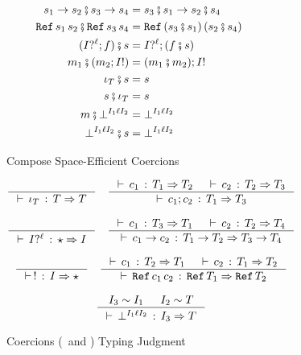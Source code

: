 \documentclass[acmtog, authorversion, acmlarge]{acmart}
\begin{document}
\begin{figure}[tbh]
\begin{subfigure}{.5\textwidth}
\begin{align*}
    \\
      \cmp{\fn{\SE_1}{\SE_2}}
          {\fn{\SE_3}{\SE_4}} &=
          \fn{\cmp{\SE_3}{\SE_1}}
             {\cmp{\SE_2}{\SE_4}}
    \\
    \cmp{\rf{\SE_1}{\SE_2}}{\rf{\SE_3}{\SE_4}} &=
    \rf{(\cmp{\SE_3}{\SE_1})}{(\cmp{\SE_2}{\SE_4})}
    \\
    \cmp{(\Seq{\prj[\I]{\Lbl}}{\Fnl})}{\SE} &=
    \Seq{\prj[\I]{\Lbl}}{(\cmp{\Fnl}{\SE})}
    \\
    \cmp{\Int_1}{(\Seq{\Int_2}{\inj[\I]})} &=
    \Seq{(\cmp{\Int_1}{\Int_2})}{\inj[\I]}
    \\
    \cmp{\id[\T]}{\SE} &= \SE
    \\
    \cmp{\SE}{\id[\T]} &= \SE
    \\
    \cmp{\Int}{\failed{\I_1}{\Lbl}{\I_2}} &=
    \failed{\I_1}{\Lbl}{\I_2}
    \\
    \cmp{\failed{\I_1}{\Lbl}{\I_2}}{\SE} &=
    \failed{\I_1}{\Lbl}{\I_2}
    \end{align*}
    \caption{Compose Space-Efficient Coercions}
    \label{fig:composeMed}
      \end{subfigure}%
    \begin{subfigure}{.5\textwidth}
    \begin{gather*}
      \inference{}{\cwt{\id[\T]}{\T}{\T}}
      \quad
      \inference{\cwt{\Crcn_1}{\T_1}{\T_2} & \cwt{\Crcn_2}{\T_2}{\T_3}}
                {\cwt{\Seq{\Crcn_1}{\Crcn_2}}{\T_1}{\T_3}}
      \\[2ex]
      \inference{}{\cwt{\prj[\I]{\Lbl}}{\Dyn}{\I}}
      \quad
      \inference{\cwt{\Crcn_1}{\T_{3}}{\T_{1}} & \cwt{\Crcn_2}{\T_{2}}{\T_{4}}}
                {\cwt{\fn{\Crcn_1}{\Crcn_2}}
                     {\Fn{\T_{1}}{\T_{2}}}
                     {\Fn{\T_{3}}{\T_{4}}}}
      \\[2ex]
      \inference{}{\cwt{\inj}{\I}{\Dyn}}
      \quad
      \inference{\cwt{\Crcn_1}{\T_{2}}{\T_{1}} &
                 \cwt{\Crcn_2}{\T_{1}}{\T_{2}}}
                {\cwt{\rf{\Crcn_1}{\Crcn_2}}
                     {\Ref{\T_{1}}}
                     {\Ref{\T_{2}}}}
      \\[2ex]
      \inference{\I_3 \sim \I_1 & \I_2 \sim \T}
                {\cwt{\failed{\I_1}{\Lbl}{\I_2}}{\I_3}{\T}}
    \end{gather*}
    \caption{Coercions (\Crcn \, and \SE) Typing Judgment}
    \label{fig:typingJudgment}
  \end{subfigure}
  \begin{subfigure}{.5\textwidth}

\end{subfigure}
\end{figure}
\end{document}
